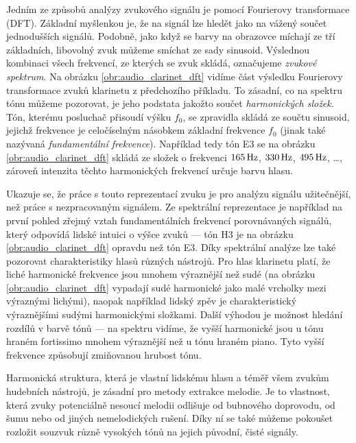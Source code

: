 Jedním ze způsobů analýzy zvukového signálu je pomocí Fourierovy transformace (DFT). Základní myšlenkou je, že na signál lze hledět jako na vážený součet jednodušších signálů. Podobně, jako když se barvy na obrazovce míchají ze tří základních, libovolný zvuk můžeme smíchat ze sady sinusoid. Výslednou kombinaci všech frekvencí, ze kterých se zvuk skládá, označujeme \emph{zvukové spektrum}. Na obrázku \ref{obr:audio_clarinet_dft} vidíme část výsledku Fourierovy transformace zvuků klarinetu z předchozího příkladu. To zásadní, co na spektru tónu můžeme pozorovat, je jeho podstata jakožto součet \emph{harmonických složek}. Tón, kterému posluchač přisoudí výšku $f_0$, se zpravidla skládá ze součtu sinusoid, jejichž frekvence je celočíselným násobkem základní frekvence $f_0$ (jinak také nazývaná \emph{fundamentální frekvence}). Například tedy tón E3 se na obrázku \ref{obr:audio_clarinet_dft} skládá ze složek o frekvenci $165\,\rm Hz$, $330\,\rm Hz$, $495\,\rm Hz$, \dots, zároveň intenzita těchto harmonických frekvencí určuje barvu hlasu.

Ukazuje se, že práce s touto reprezentací zvuku je pro analýzu signálu užitečnější, než práce s nezpracovaným signálem. Ze spektrální reprezentace je například na první pohled zřejmý vztah fundamentálních frekvencí porovnávaných signálů, který odpovídá lidské intuici o výšce zvuků --- tón H3 je na obrázku \ref{obr:audio_clarinet_dft} opravdu  než tón E3. Díky spektrální analýze lze také pozorovat charakteristiky hlasů různých nástrojů. Pro hlas klarinetu platí, že liché harmonické frekvence jsou mnohem výraznější než sudé (na obrázku \ref{obr:audio_clarinet_dft} vypadají sudé harmonické jako malé vrcholky mezi výraznými lichými), naopak například lidský zpěv je charakteristický výraznějšími sudými harmonickými složkami. Další výhodou je možnost hledání rozdílů v barvě tónů --- na spektru vidíme, že vyšší harmonické jsou u tónu hraném fortissimo mnohem výraznější než u tónu hraném piano. Tyto vyšší frekvence způsobují zmiňovanou hrubost tónu.

Harmonická struktura, která je vlastní lidskému hlasu a téměř všem zvukům hudebních nástrojů, je zásadní pro metody extrakce melodie. Je to vlastnost, která zvuky potenciálně nesoucí melodii odlišuje od bubnového doprovodu, od šumu nebo od jiných nemelodických rušení. Díky ní se také můžeme pokoušet rozložit souzvuk různě vysokých tónů na jejich původní, čisté signály. 

